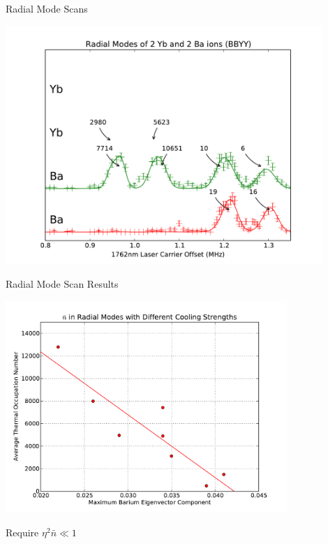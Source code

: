 \documentclass{beamer}
\begin{document}
\begin{frame}{Radial Mode Scans}
	\centerline{\includegraphics[width=0.9\textwidth]{RadialScanBBYY}}
\end{frame}

\begin{frame}{Radial Mode Scan Results}
	\centerline{\includegraphics[width=0.8\textwidth]{RadialNBarEigenvectors}}
	\pause
	\centerline{Require $\eta^2 \bar{n} \ll 1$}
\end{frame}
\end{document}

